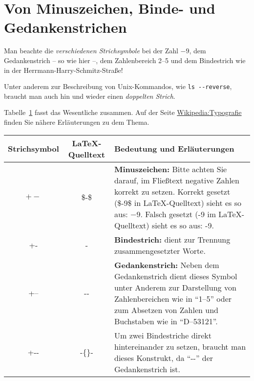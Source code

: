 \documentclass[12pt,a4paper]{scrartcl}
\begin{document}
%
\section*{Von Minuszeichen, Binde- und Gedankenstrichen}
Man beachte die \emph{verschiedenen Strichsymbole} bei der Zahl $-9$,
dem Gedankenstrich -- so wie hier --, dem Zahlenbereich 2--5 und dem
Bindestrich wie in der Herrmann-Harry-Schmitz-Straße!

Unter anderem zur Beschreibung von Unix-Kommandos, wie \texttt{ls
  -{}-reverse}, braucht man auch hin und wieder einen \emph{doppelten
  Strich}.

Tabelle~\ref{tab:strichsymbole} fasst das Wesentliche zusammen. Auf
der Seite
\href{https://de.wikipedia.org/wiki/Wikipedia:Typografie#Bindestrich.2C_Gedankenstrich.2C_Minuszeichen_und_andere_waagerechte_Striche}{Wikipedia:Typografie}
finden Sie nähere Erläuterungen zu dem Thema.
%
\begin{table}[h]
  \centering
  \label{tab:strichsymbole}
  \begin{tabularx}{\textwidth}{ccX}
    \toprule
    Strichsymbol & \LaTeX-Quelltext & Bedeutung und Erläuterungen \\
    \midrule
    $+-$ & \$-\$ & \textbf{Minuszeichen:} Bitte achten Sie darauf, im
      Fließtext negative Zahlen korrekt zu setzen. Korrekt gesetzt
      (\$-9\$ in \LaTeX-Quelltext) sieht es so aus: $-9$. Falsch
      gesetzt (-9 im \LaTeX-Quelltext) sieht es so aus: -9.\\
    +- & - & \textbf{Bindestrich:} dient zur Trennung
      zusammengesetzter Worte. \\
    +-- & -{}- & \textbf{Gedankenstrich:} Neben dem Gedankenstrich
      dient dieses Symbol unter Anderem zur Darstellung von
      Zahlenbereichen wie in \enquote{1--5} oder zum Absetzen
      von Zahlen und Buchstaben wie in \enquote{D--53121}. \\
    +-{}- & -\{\}- & Um zwei Bindestriche direkt hintereinander zu
      setzen, braucht man dieses Konstrukt, da \enquote{-{}-} der
      Gedankenstrich ist. \\
      \bottomrule
  \end{tabularx}
\end{table}
\end{document}
